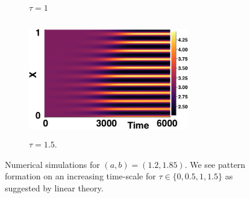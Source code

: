\documentclass[12pt]{report}
\begin{document}
\begin{figure}[H]
\begin{subfigure}[b]{0.45\textwidth}
        \caption{$\tau=1$}
        \label{}
    \end{subfigure}
    \hfill
    \begin{subfigure}[b]{0.45\textwidth}
        \centering
        \includegraphics[width=7cm,height=5cm]{p2t15.png}
        \caption{$\tau=1.5$.}
        \label{}
    \end{subfigure}
    \caption{Numerical simulations for $(a,b)=(1.2,1.85)$. We see pattern formation on an increasing time-scale for $\tau\in\{0,0.5,1,1.5\}$ as suggested by linear theory.}
    \label{fig:testturing3}
\end{figure}
\end{document}
